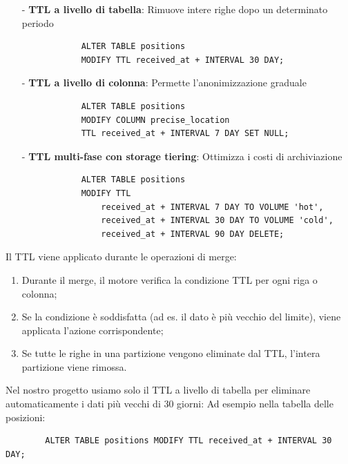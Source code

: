 \documentclass[10pt]{article}
\begin{document}
        \begin{itemize}
            \item[-] \textbf{TTL a livello di tabella}: Rimuove intere righe dopo un determinato periodo
            \begin{lstlisting}
            ALTER TABLE positions
            MODIFY TTL received_at + INTERVAL 30 DAY;
            \end{lstlisting}

            \item[-] \textbf{TTL a livello di colonna}: Permette l'anonimizzazione graduale
            \begin{lstlisting}
            ALTER TABLE positions
            MODIFY COLUMN precise_location
            TTL received_at + INTERVAL 7 DAY SET NULL;
            \end{lstlisting}

            \item[-] \textbf{TTL multi-fase con storage tiering}: Ottimizza i costi di archiviazione
            \begin{lstlisting}
            ALTER TABLE positions
            MODIFY TTL
                received_at + INTERVAL 7 DAY TO VOLUME 'hot',
                received_at + INTERVAL 30 DAY TO VOLUME 'cold',
                received_at + INTERVAL 90 DAY DELETE;
            \end{lstlisting}
        \end{itemize}

        Il TTL viene applicato durante le operazioni di merge:
        \begin{enumerate}
            \item Durante il merge, il motore verifica la condizione TTL per ogni riga o colonna;
            \item Se la condizione è soddisfatta (ad es. il dato è più vecchio del limite), viene applicata l'azione corrispondente;
            \item Se tutte le righe in una partizione vengono eliminate dal TTL, l'intera partizione viene rimossa.
        \end{enumerate}

        Nel nostro progetto usiamo solo il TTL a livello di tabella per eliminare automaticamente i dati più vecchi di 30 giorni:
        Ad esempio nella tabella delle posizioni:
        \begin{lstlisting}
        ALTER TABLE positions MODIFY TTL received_at + INTERVAL 30 DAY;
        \end{lstlisting}
\end{document}
